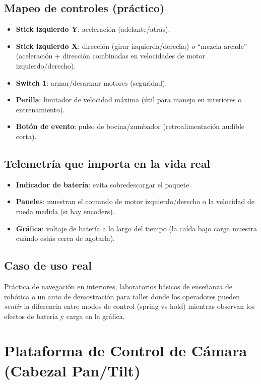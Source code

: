 \subsection*{Mapeo de controles (práctico)}
\begin{itemize}
    \item \textbf{Stick izquierdo Y}: aceleración (adelante/atrás).
    \item \textbf{Stick izquierdo X}: dirección (girar izquierda/derecha) \emph{o} “mezcla arcade” (aceleración + dirección combinadas en velocidades de motor izquierdo/derecho).
    \item \textbf{Switch 1}: armar/desarmar motores (seguridad).
    \item \textbf{Perilla}: limitador de velocidad máxima (útil para manejo en interiores o entrenamiento).
    \item \textbf{Botón de evento}: pulso de bocina/zumbador (retroalimentación audible corta).
\end{itemize}

\subsection*{Telemetría que importa en la vida real}
\begin{itemize}
    \item \textbf{Indicador de batería}: evita sobredescargar el paquete.
    \item \textbf{Paneles}: muestran el comando de motor izquierdo/derecho o la velocidad de rueda medida (si hay encoders).
    \item \textbf{Gráfica}: voltaje de batería a lo largo del tiempo (la caída bajo carga muestra cuándo estás cerca de agotarla).
\end{itemize}

\subsection*{Caso de uso real}
Práctica de navegación en interiores, laboratorios básicos de enseñanza de robótica o un auto de demostración para taller donde los operadores pueden \textit{sentir} la diferencia entre modos de control (spring vs hold) mientras observan los efectos de batería y carga en la gráfica.

\section{Plataforma de Control de Cámara (Cabezal Pan/Tilt)}
\label{sec:example-camera-platform}

